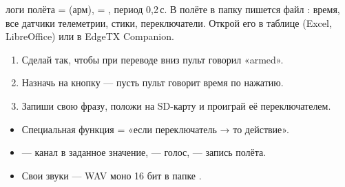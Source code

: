\begin{recipe}{логи полёта}
 =  (арм),  = , период 0,2\,с. В полёте
в папку  пишется файл : время, все датчики телеметрии, стики,
переключатели. Открой его в таблице (Excel, LibreOffice) или в EdgeTX Companion.
\end{recipe}

\begin{tryit}
\begin{enumerate}
  \item Сделай так, чтобы при переводе  вниз пульт говорил «armed».
  \item Назначь на кнопку   --- пусть пульт говорит время по нажатию.
  \item Запиши свою фразу, положи на SD-карту и проиграй её переключателем.
\end{enumerate}
\end{tryit}

\begin{summary}
\begin{itemize}
  \item Специальная функция = «если переключатель → то действие».
  \item {} --- канал в заданное значение,  --- голос,
         --- запись полёта.
  \item Свои звуки --- WAV моно 16 бит в папке .
\end{itemize}
\end{summary}
